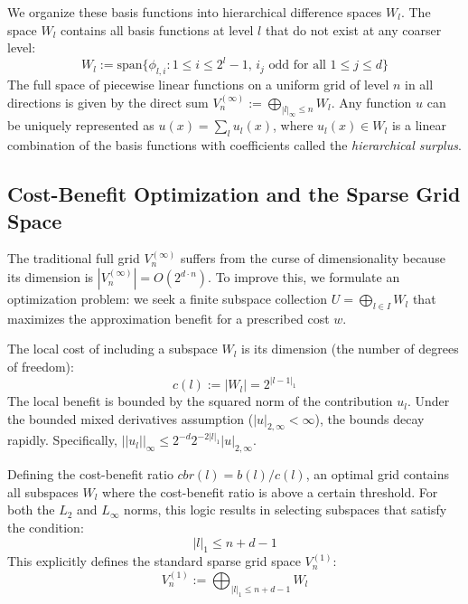 \documentclass[12pt, a4paper]{article}
\begin{document}
We organize these basis functions into hierarchical difference spaces $W_l$. The space $W_l$ contains all basis functions at level $l$ that do not exist at any coarser level:
\begin{equation}
W_l := \text{span}\{ \phi_{l,i} : 1 \le i \le 2^l - 1, \, i_j \text{ odd for all } 1 \le j \le d \}
\end{equation}
The full space of piecewise linear functions on a uniform grid of level $n$ in all directions is given by the direct sum $V_n^{(\infty)} := \bigoplus_{|l|_\infty \le n} W_l$. Any function $u$ can be uniquely represented as $u(x) = \sum_{l} u_l(x)$, where $u_l(x) \in W_l$ is a linear combination of the basis functions with coefficients called the \textit{hierarchical surplus}.

\subsection{Cost-Benefit Optimization and the Sparse Grid Space}
The traditional full grid $V_n^{(\infty)}$ suffers from the curse of dimensionality because its dimension is $|V_n^{(\infty)}| = O(2^{d \cdot n})$. To improve this, we formulate an optimization problem: we seek a finite subspace collection $U = \bigoplus_{l \in I} W_l$ that maximizes the approximation benefit for a prescribed cost $w$.

The local cost of including a subspace $W_l$ is its dimension (the number of degrees of freedom):
\begin{equation}
c(l) := |W_l| = 2^{|l-1|_1}
\end{equation}
The local benefit is bounded by the squared norm of the contribution $u_l$. Under the bounded mixed derivatives assumption ($|u|_{2,\infty} < \infty$), the bounds decay rapidly. Specifically, $||u_l||_\infty \le 2^{-d} 2^{-2|l|_1} |u|_{2,\infty}$.

Defining the cost-benefit ratio $cbr(l) = b(l)/c(l)$, an optimal grid contains all subspaces $W_l$ where the cost-benefit ratio is above a certain threshold. For both the $L_2$ and $L_\infty$ norms, this logic results in selecting subspaces that satisfy the condition:
\begin{equation}
|l|_1 \le n + d - 1
\end{equation}
This explicitly defines the standard sparse grid space $V_n^{(1)}$:
\begin{equation}
V_n^{(1)} := \bigoplus_{|l|_1 \le n + d - 1} W_l
\end{equation}
\end{document}
